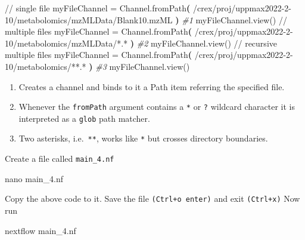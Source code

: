 \documentclass[
]{book}
\newenvironment{Shaded}{\begin{snugshade}}{\end{snugshade}}
\newcommand{\CommentTok}[1]{\textcolor[rgb]{0.56,0.35,0.01}{\textit{#1}}}
\newcommand{\ErrorTok}[1]{\textcolor[rgb]{0.64,0.00,0.00}{\textbf{#1}}}
\newcommand{\ExtensionTok}[1]{#1}
\newcommand{\FunctionTok}[1]{\textcolor[rgb]{0.00,0.00,0.00}{#1}}
\newcommand{\KeywordTok}[1]{\textcolor[rgb]{0.13,0.29,0.53}{\textbf{#1}}}
\newcommand{\NormalTok}[1]{#1}
\newcommand{\StringTok}[1]{\textcolor[rgb]{0.31,0.60,0.02}{#1}}
\providecommand{\tightlist}{%
  \setlength{\itemsep}{0pt}\setlength{\parskip}{0pt}}
\begin{document}
\begin{Shaded}
\begin{Highlighting}[numbers=left,,]
\ExtensionTok{//}\NormalTok{ single file}
\ExtensionTok{myFileChannel}\NormalTok{ = Channel.fromPath}\ErrorTok{(} \StringTok{\textquotesingle{}/crex/proj/uppmax2022{-}2{-}10/metabolomics/mzMLData/Blank10.mzML\textquotesingle{}} \KeywordTok{)} \CommentTok{\#1}
\FunctionTok{myFileChannel.view()}
\ExtensionTok{//}\NormalTok{ multiple files}
\ExtensionTok{myFileChannel}\NormalTok{ = Channel.fromPath}\ErrorTok{(} \StringTok{\textquotesingle{}/crex/proj/uppmax2022{-}2{-}10/metabolomics/mzMLData/*.*\textquotesingle{}} \KeywordTok{)} \CommentTok{\#2}
\FunctionTok{myFileChannel.view()}
\ExtensionTok{//}\NormalTok{ recursive multiple files}
\ExtensionTok{myFileChannel}\NormalTok{ = Channel.fromPath}\ErrorTok{(} \StringTok{\textquotesingle{}/crex/proj/uppmax2022{-}2{-}10/metabolomics/**.*\textquotesingle{}} \KeywordTok{)} \CommentTok{\#3}
\FunctionTok{myFileChannel.view()}
\end{Highlighting}
\end{Shaded}

\begin{enumerate}
\def\labelenumi{\arabic{enumi}.}
\tightlist
\item
  Creates a channel and binds to it a Path item referring the specified file.
\item
  Whenever the \texttt{fromPath} argument contains a \texttt{*} or \texttt{?} wildcard character it is interpreted as a \texttt{glob} path matcher.
\item
  Two asterisks, i.e.~\texttt{**}, works like \texttt{*} but crosses directory boundaries.
\end{enumerate}

Create a file called \texttt{main\_4.nf}

\begin{Shaded}
\begin{Highlighting}[numbers=left,,]
\FunctionTok{nano}\NormalTok{ main\_4.nf}
\end{Highlighting}
\end{Shaded}

Copy the above code to it. Save the file \texttt{(Ctrl+o\ enter)} and exit \texttt{(Ctrl+x)}
Now run

\begin{Shaded}
\begin{Highlighting}[numbers=left,,]
\ExtensionTok{nextflow}\NormalTok{ main\_4.nf}
\end{Highlighting}
\end{Shaded}
\end{document}
